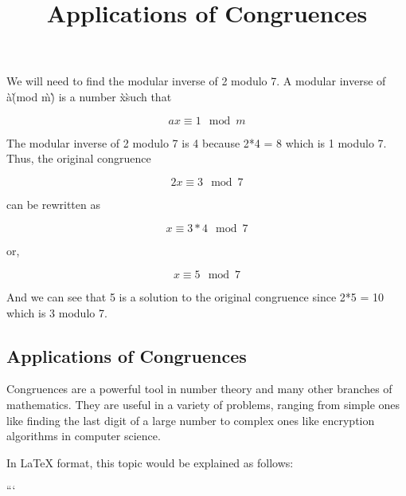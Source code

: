 We will need to find the modular inverse of 2 modulo 7. A modular inverse of \`a\`(mod \`m\`) is a number \`x\` such that

\begin{equation}
ax \equiv 1 \mod{m}
\end{equation}

The modular inverse of 2 modulo 7 is 4 because 2*4 = 8 which is 1 modulo 7. Thus, the original congruence 

\begin{equation}
2x \equiv 3 \mod{7}
\end{equation}

can be rewritten as

\begin{equation}
x \equiv 3 * 4 \mod{7} 
\end{equation}

or,

\begin{equation}
x \equiv 5 \mod{7}
\end{equation}

And we can see that 5 is a solution to the original congruence since 2*5 = 10 which is 3 modulo 7.

\subsection{Applications of Congruences}
Congruences are a powerful tool in number theory and many other branches of mathematics. They are useful in a variety of problems, ranging from simple ones like finding the last digit of a large number to complex ones like encryption algorithms in computer science.

In LaTeX format, this topic would be explained as follows:

```
\documentclass[12pt]{article}
\usepackage{amsmath}


\title{Applications of Congruences}
\maketitle

A congruence relation is a binary relation that satisfies the reflexive, symmetric, and transitive properties. One common type of congruence relates to integers and their remainders when divided by a fixed positive integer $m$. For example, two integers $a$ and $b$ are congruent modulo $m$ if $a - b$ is divisible by $m$. This can be written as:
\begin{equation}
a \equiv b \, (\, m)
\end{equation}

